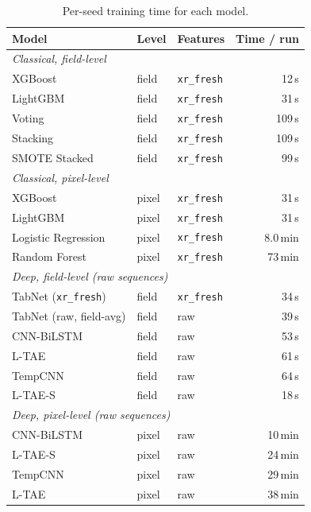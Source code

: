 \documentclass[preprint,authoryear,3p]{elsarticle}
\begin{document}
\begin{table}[!t]
\centering
\scriptsize
\caption{Per-seed training time for each model.}
\label{stab:cost}
\renewcommand{\arraystretch}{1.12}
\setlength{\tabcolsep}{6pt}
\begin{tabular}{lllr}
\toprule
\textbf{Model} & \textbf{Level} & \textbf{Features} & \textbf{Time / run} \\
\midrule
\multicolumn{4}{l}{\emph{Classical, field-level}}\\
XGBoost                & field & \texttt{xr\_fresh} & 12\,s \\
LightGBM               & field & \texttt{xr\_fresh} & 31\,s \\
Voting                 & field & \texttt{xr\_fresh} & 109\,s \\
Stacking               & field & \texttt{xr\_fresh} & 109\,s \\
SMOTE Stacked          & field & \texttt{xr\_fresh} & 99\,s \\
\midrule
\multicolumn{4}{l}{\emph{Classical, pixel-level}}\\
XGBoost                & pixel & \texttt{xr\_fresh} & 31\,s \\
LightGBM               & pixel & \texttt{xr\_fresh} & 31\,s \\
Logistic Regression    & pixel & \texttt{xr\_fresh} & 8.0\,min \\
Random Forest          & pixel & \texttt{xr\_fresh} & 73\,min \\
\midrule
\multicolumn{4}{l}{\emph{Deep, field-level (raw sequences)}}\\
TabNet (\texttt{xr\_fresh}) & field & \texttt{xr\_fresh} & 34\,s \\
TabNet (raw, field-avg) & field & raw & 39\,s \\
CNN-BiLSTM             & field & raw & 53\,s \\
L-TAE                  & field & raw & 61\,s \\
TempCNN                & field & raw & 64\,s \\
L-TAE-S                & field & raw & 18\,s \\
\midrule
\multicolumn{4}{l}{\emph{Deep, pixel-level (raw sequences)}}\\
CNN-BiLSTM             & pixel & raw & 10\,min \\
L-TAE-S                & pixel & raw & 24\,min \\
TempCNN                & pixel & raw & 29\,min \\
L-TAE                  & pixel & raw & 38\,min \\

\end{tabular}
\end{table}
\end{document}
